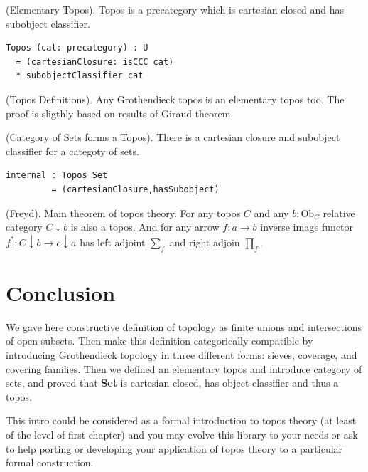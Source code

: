 \begin{definition}
\begin{definition} (Elementary Topos).
Topos is a precategory which is cartesian closed and has subobject classifier.
\begin{lstlisting}
Topos (cat: precategory) : U
  = (cartesianClosure: isCCC cat)
  * subobjectClassifier cat
\end{lstlisting}
\end{definition}

\begin{theorem} (Topos Definitions).
Any Grothendieck topos is an elementary topos too.
The proof is sligthly based on results of Giraud theorem.
\end{theorem}

\begin{theorem} (Category of Sets forms a Topos).
There is a cartesian closure and subobject classifier for a categoty of sets.
\begin{lstlisting}
internal : Topos Set
         = (cartesianClosure,hasSubobject)
\end{lstlisting}
\end{theorem}

\begin{theorem} (Freyd). Main theorem of topos theory\cite{Goldblatt14}.
For any topos $C$ and any $b : \mathrm{Ob}_C$ relative category $C\downarrow b$ is also a topos.
And for any arrow $f: a \rightarrow b$ inverse image functor $f^*: C\downarrow b \rightarrow c\downarrow a$
has left adjoint $\sum_f$ and right adjoin $\prod_f$.
\end{theorem}

\section*{Conclusion}

We gave here constructive definition of topology as finite unions and
intersections of open subsets. Then make this definition categorically
compatible by introducing Grothendieck topology in three different forms: sieves, coverage,
and covering families. Then we defined an elementary topos and introduce category of sets,
and proved that {\bf Set} is cartesian closed, has object classifier and thus a topos.

This intro could be considered as a formal introduction to topos theory (at least of the level of first chapter)
and you may evolve this library to your needs or ask to help porting or developing your application
of topos theory to a particular formal construction.


\end{definition}
